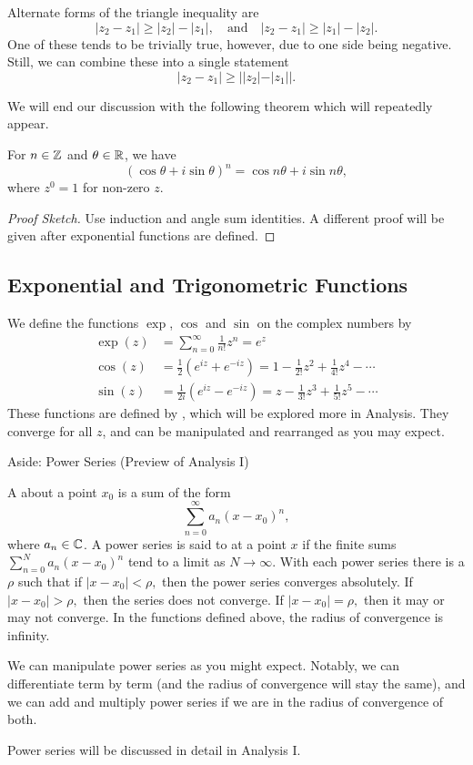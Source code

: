 \documentclass[a4paper]{scrartcl}
\begin{document}
Alternate forms of the triangle inequality are
$$
|z_2 - z_1| \geq |z_2| - |z_1|, \quad \text{and} \quad |z_2  - z_1| \geq |z_1| - |z_2|.
$$
One of these tends to be trivially true, however, due to one side being negative. Still, we can combine these into a single statement
$$
|z_2 - z_1| \geq ||z_2| - |z_1||.
$$

We will end our discussion with the following theorem which will repeatedly appear.

\begin{theorem}
	For $n \in \mathbb{Z}$ and $\theta \in \mathbb{R}$, we have
	$$
	(\cos \theta + i \sin \theta)^n = \cos n \theta + i \sin n \theta,
	$$
	where $z^0 = 1$ for non-zero $z$.
\end{theorem}
\begin{proof}[Proof Sketch]
	Use induction and angle sum identities. A different proof will be given after exponential functions are defined.
\end{proof}

\subsection{Exponential and Trigonometric Functions}

We define the functions $\exp$, $\cos$ and $\sin$ on the complex numbers by
\begin{align*}
	\exp(z) &= \sum_{n = 0}^{\infty} \frac{1}{n!} z^n = e^z \\
	\cos(z) &= \frac{1}{2}(e^{iz} + e^{-iz}) = 1 - \frac{1}{2!}z^2 + \frac{1}{4!} z^4 - \cdots \\
	\sin(z) &= \frac{1}{2i}(e^{iz} - e^{-iz}) = z - \frac{1}{3!}z^3 + \frac{1}{5!}z^5 - \cdots
\end{align*}
These functions are defined by , which will be explored more in Analysis. They converge for all $z$, and can be manipulated and rearranged as you may expect.

\begin{aside}{Aside: Power Series (Preview of Analysis I)}

	A  about a point $x_0$ is a sum of the form
	$$
	\sum_{n = 0}^{\infty} a_n(x - x_0)^n,	
	$$
	where $a_n \in \mathbb{C}$. A power series is said to  at a point $x$ if the finite sums
	$
	\sum_{n = 0}^N a_n(x - x_0)^n
	$
	tend to a limit as $N \rightarrow \infty$. With each power series there is a  $\rho$ such that if $\left|x-x_{0}\right|<\rho,$ then the power series converges absolutely. If $\left|x-x_{0}\right|>\rho,$ then the series does not converge. If $\left|x-x_{0}\right|=\rho,$ then it may or may not converge. In the functions defined above, the radius of convergence is infinity.


	We can manipulate power series as you might expect. Notably, we can differentiate term by term (and the radius of convergence will stay the same), and we can add and multiply power series if we are in the radius of convergence of both.

	Power series will be discussed in detail in Analysis I.
	
\end{aside}
\end{document}
